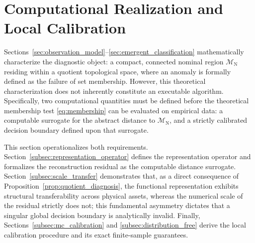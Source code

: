 \documentclass[a4paper]{cas-sc}
\newcommand{\Mnominal}{\ensuremath{\mathcal{M}_{\mathrm{N}}}}
\begin{document}
\section{Computational Realization and Local Calibration}
\label{sec:computational_realization}

Sections~\ref{sec:observation_model}--\ref{sec:emergent_classification} mathematically characterize the diagnostic object: a compact, connected nominal region \(\Mnominal\) residing within a quotient topological space, where an anomaly is formally defined as the failure of set membership. However, this theoretical characterization does not inherently constitute an executable algorithm. Specifically, two computational quantities must be defined before the theoretical membership test \eqref{eq:membership} can be evaluated on empirical data: a computable surrogate for the abstract distance to \(\Mnominal\), and a strictly calibrated decision boundary defined upon that surrogate.

This section operationalizes both requirements. Section~\ref{subsec:representation_operator} defines the representation operator and formalizes the reconstruction residual as the computable distance surrogate. Section~\ref{subsec:scale_transfer} demonstrates that, as a direct consequence of Proposition~\ref{prop:quotient_diagnosis}, the functional representation exhibits structural transferability across physical assets, whereas the numerical scale of the residual strictly does not; this fundamental asymmetry dictates that a singular global decision boundary is analytically invalid. Finally, Sections~\ref{subsec:mc_calibration} and \ref{subsec:distribution_free} derive the local calibration procedure and its exact finite-sample guarantees. 
\end{document}
